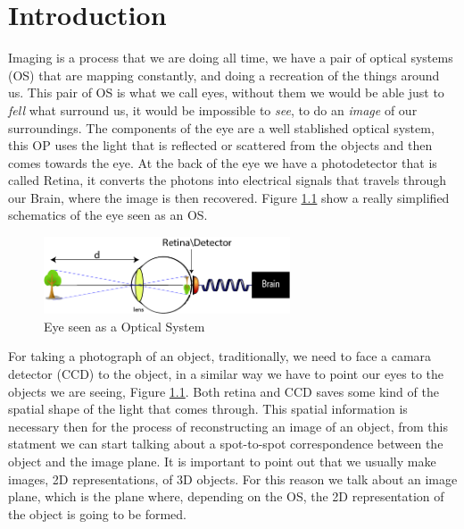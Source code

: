 
\chapter{Introduction} %

\label{Chapter1} %

Imaging is a process that we are doing all time, we have a pair of optical systems (OS) that are mapping
constantly, and doing a recreation of the things around us. This pair of OS is what we call eyes, 
without them we would be able just to \textit{fell} what surround us, it would be impossible to \textit{see}, to do an
\textit{image} of our surroundings. The components of the eye are a well stablished optical system, this OP 
uses the light that is reflected or scattered from the objects and then comes towards the eye. At the
back of the eye we have a photodetector that is called Retina, it converts the photons into electrical
signals that travels through our Brain, where the image is then recovered. Figure \ref{fig:eye} show a really 
simplified schematics of the eye seen as an OS.

\begin{figure}[h!]
\centering
\label{fig:eye}
 \includegraphics[width=0.65\textwidth]{Figures/eye.png}
 \caption{Eye seen as a Optical System} 
\end{figure}


For taking a photograph of an object, traditionally, we need to face a camara detector (CCD) to the object, 
in a similar way we have to point our eyes to the objects we are seeing, Figure \ref{fig:eye}.
Both retina and CCD saves some kind of the spatial shape of the light that comes through.
This spatial information is necessary then for the process of reconstructing an image of an object, from this
statment we can start talking about a spot-to-spot correspondence between the object and the image plane.
It is important to point out that we usually make images, 2D representations, of 3D objects. For this
reason we talk about an image plane, which is the plane where, depending on the OS, the 2D representation
of the object is going to be formed. 



